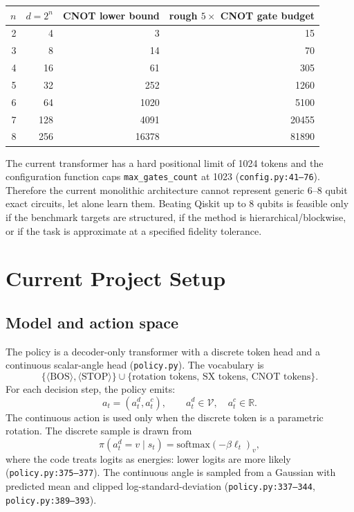 \documentclass[11pt,a4paper]{article}
\newcommand{\STOP}{\langle \mathrm{STOP}\rangle}
\newcommand{\BOS}{\langle \mathrm{BOS}\rangle}
\newcommand{\R}{\mathbb{R}}
\newcommand{\softmax}{\mathrm{softmax}}
\begin{document}
\begin{center}
\begin{tabular}{rrrr}
\toprule
$n$ & $d=2^n$ & CNOT lower bound & rough $5 \times$ CNOT gate budget \\
\midrule
2 & 4   & 3     & 15 \\
3 & 8   & 14    & 70 \\
4 & 16  & 61    & 305 \\
5 & 32  & 252   & 1260 \\
6 & 64  & 1020  & 5100 \\
7 & 128 & 4091  & 20455 \\
8 & 256 & 16378 & 81890 \\
\bottomrule
\end{tabular}
\end{center}

The current transformer has a hard positional limit of 1024 tokens and the
configuration function caps \texttt{max\_gates\_count} at 1023
(\texttt{config.py:41--76}). Therefore the current monolithic architecture
cannot represent generic 6--8 qubit exact circuits, let alone learn them.
Beating Qiskit up to 8 qubits is feasible only if the benchmark targets are
structured, if the method is hierarchical/blockwise, or if the task is
approximate at a specified fidelity tolerance.

\section{Current Project Setup}

\subsection{Model and action space}

The policy is a decoder-only transformer with a discrete token head and a
continuous scalar-angle head (\texttt{policy.py}). The vocabulary is
\[
  \{\BOS,\STOP\} \cup \{\text{rotation tokens, SX tokens, CNOT tokens}\}.
\]
For each decision step, the policy emits:
\[
  a_t=(a_t^d,a_t^c),\qquad a_t^d \in \mathcal{V},\quad a_t^c\in\R.
\]
The continuous action is used only when the discrete token is a parametric
rotation. The discrete sample is drawn from
\[
  \pi(a_t^d=v\mid s_t)
  =
  \softmax(-\beta \ell_t)_v,
\]
where the code treats logits as energies: lower logits are more likely
(\texttt{policy.py:375--377}). The continuous angle is sampled from a
Gaussian with predicted mean and clipped log-standard-deviation
(\texttt{policy.py:337--344}, \texttt{policy.py:389--393}).
\end{document}
